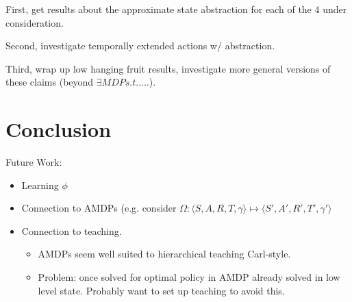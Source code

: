 \documentclass[11pt]{amsart}
\begin{document}

First, get results about the approximate state abstraction for each of the 4 under consideration.

Second, investigate temporally extended actions w/ abstraction.

Third, wrap up low hanging fruit results, investigate more general versions of these claims (beyond $\exists MDP s.t. \ldots$.).


\newpage
\section{Conclusion}

Future Work:
\begin{itemize}
\item Learning $\phi$
\item Connection to AMDPs (e.g. consider $\Omega : \langle S, A, R, T, \gamma \rangle \mapsto \langle S', A', R', T', \gamma' \rangle$
\item Connection to teaching.
\begin{itemize}
\item AMDPs seem well suited to hierarchical teaching Carl-style.
\item Problem: once solved for optimal policy in AMDP already solved in low level state. Probably want to set up teaching to avoid this.
\end{itemize}
\end{itemize}



\newpage

\end{document}
